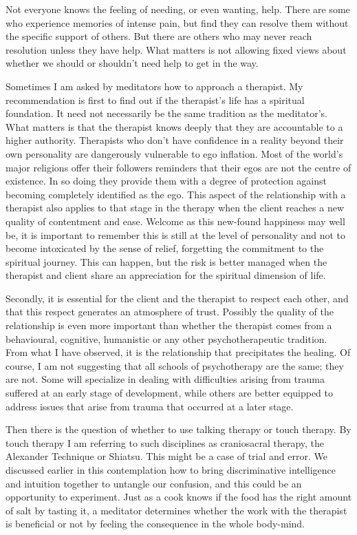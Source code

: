 \clearpage

Not everyone knows the feeling of needing, or even wanting, help. There
are some who experience memories of intense pain, but find they can
resolve them without the specific support of others. But there are
others who may never reach resolution unless they have help. What
matters is not allowing fixed views about whether we should or shouldn't
need help to get in the way.

Sometimes I am asked by meditators how to approach a therapist. My
recommendation is first to find out if the therapist's life has a
spiritual foundation. It need not necessarily be the same tradition as
the meditator's. What matters is that the therapist knows deeply that
they are accountable to a higher authority. Therapists who don't have
confidence in a reality beyond their own personality are dangerously
vulnerable to ego inflation. Most of the world's major religions offer
their followers reminders that their egos are not the centre of
existence. In so doing they provide them with a degree of protection
against becoming completely identified as the ego. This aspect of the
relationship with a therapist also applies to that stage in the therapy
when the client reaches a new quality of contentment and ease. Welcome
as this new-found happiness may well be, it is important to remember
this is still at the level of personality and not to become intoxicated
by the sense of relief, forgetting the commitment to the spiritual
journey. This can happen, but the risk is better managed when the
therapist and client share an appreciation for the spiritual dimension
of life.

Secondly, it is essential for the client and the therapist to respect
each other, and that this respect generates an atmosphere of trust.
Possibly the quality of the relationship is even more important than
whether the therapist comes from a behavioural, cognitive, humanistic or
any other psychotherapeutic tradition. From what I have observed, it is
the relationship that precipitates the healing. Of course, I am not
suggesting that all schools of psychotherapy are the same; they are not.
Some will specialize in dealing with difficulties arising from trauma
suffered at an early stage of development, while others are better
equipped to address issues that arise from trauma that occurred at a
later stage.

\enlargethispage{\baselineskip}

Then there is the question of whether to use talking therapy or touch
therapy. By touch therapy I am referring to such disciplines as
craniosacral therapy, the Alexander Technique or Shiatsu. This might be
a case of trial and error. We discussed earlier in this contemplation
how to bring discriminative intelligence and intuition together to
untangle our confusion, and this could be an opportunity to experiment.
Just as a cook knows if the food has the right amount of salt by tasting
it, a meditator determines whether the work with the therapist is
beneficial or not by feeling the consequence in the whole body-mind.

